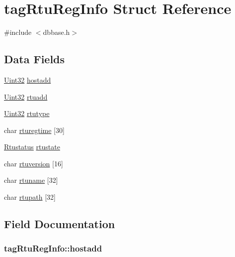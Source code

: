 \hypertarget{structtagRtuRegInfo}{\section{tag\-Rtu\-Reg\-Info Struct Reference}
\label{structtagRtuRegInfo}
}


{\ttfamily \#include $<$dbbase.\-h$>$}

\subsection*{Data Fields}
\begin{DoxyCompactItemize}
\item 
\hyperlink{base_8h_a60cf7b3c038ce37a50796e8eaddf0b5f}{Uint32} \hyperlink{structtagRtuRegInfo_a2636b6a575a7a0c322cc643f4bda443e}{hostadd}
\item 
\hyperlink{base_8h_a60cf7b3c038ce37a50796e8eaddf0b5f}{Uint32} \hyperlink{structtagRtuRegInfo_ad7e659c7f3dd0462c30300d144c87b4d}{rtuadd}
\item 
\hyperlink{base_8h_a60cf7b3c038ce37a50796e8eaddf0b5f}{Uint32} \hyperlink{structtagRtuRegInfo_a2334be9e41158bdab0bda7916cecffbc}{rtutype}
\item 
char \hyperlink{structtagRtuRegInfo_aa1fd796448e107b30b0e98489260182b}{rturegtime} \mbox{[}30\mbox{]}
\item 
\hyperlink{dbbase_8h_a78dcbe2d7ae67051ae97baded9edcb05}{Rtustatus} \hyperlink{structtagRtuRegInfo_aa8cbcd6d4cc75ae2941924d7192575b8}{rtustate}
\item 
char \hyperlink{structtagRtuRegInfo_a7ca4730d5e1c74afc6d0fd939fecf65f}{rtuversion} \mbox{[}16\mbox{]}
\item 
char \hyperlink{structtagRtuRegInfo_a9861a6ba54a15e0855d30e48035717b8}{rtuname} \mbox{[}32\mbox{]}
\item 
char \hyperlink{structtagRtuRegInfo_a5747ec6866797567cf13966b2a078c37}{rtupath} \mbox{[}32\mbox{]}
\end{DoxyCompactItemize}


\subsection{Field Documentation}
\hypertarget{structtagRtuRegInfo_a2636b6a575a7a0c322cc643f4bda443e}{
\subsubsection[{hostadd}]{ tag\-Rtu\-Reg\-Info\-::hostadd}}\label{structtagRtuRegInfo_a2636b6a575a7a0c322cc643f4bda443e}


